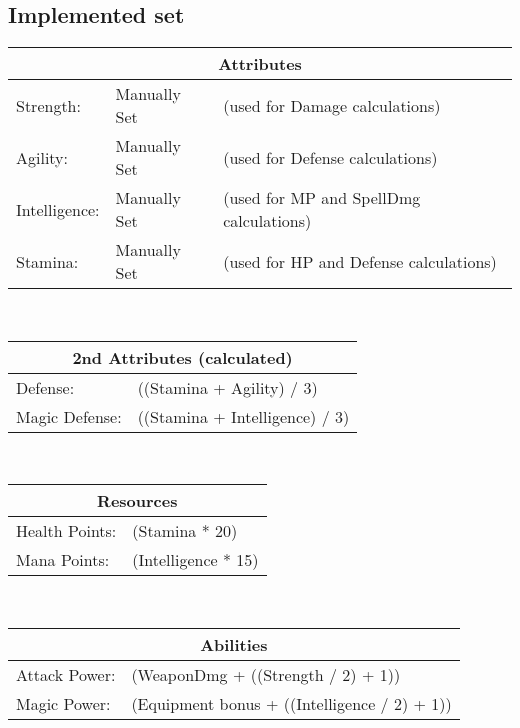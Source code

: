 \subsection{Implemented set}
\label{language:implset}
\begin{tabular}{|l l l|}
\hline
\multicolumn{3}{|c|}{\textbf{Attributes}}\\
\hline
Strength: & Manually Set & (used for Damage calculations)\\
\hline
Agility: & Manually Set	 & (used for Defense calculations)\\
\hline
Intelligence: & Manually Set & (used for MP and SpellDmg calculations)\\
\hline
Stamina: & Manually Set & (used for HP and Defense calculations)\\
\hline
\end{tabular}
\\
\begin{tabular}{|l l|}
\hline
\multicolumn{2}{|c|}{\textbf{2nd Attributes (calculated)}}\\
\hline
Defense: & ((Stamina + Agility) / 3)\\
\hline
Magic Defense: & ((Stamina + Intelligence) / 3)\\
\hline	
\end{tabular}
\\
\begin{tabular}{|l l|}
\hline
\multicolumn{2}{|c|}{\textbf{Resources}}\\
\hline
Health Points: & (Stamina * 20)\\
\hline
Mana Points: & (Intelligence * 15)\\
\hline
\end{tabular}
\\
\begin{tabular}{|l l|}
\hline
\multicolumn{2}{|c|}{\textbf{Abilities}}\\
\hline
Attack Power: & (WeaponDmg + ((Strength / 2) + 1))\\
\hline
Magic Power: & (Equipment bonus + ((Intelligence / 2) + 1))\\
\hline
\end{tabular}


